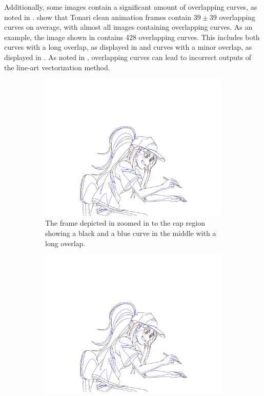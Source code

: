 Additionally, some images contain a significant amount of overlapping curves, as noted in .  show that Tonari clean animation frames contain $39\pm39$ overlapping curves on average, with almost all images containing overlapping curves. As an example, the image shown in  contains 428 overlapping curves. This includes both curves with a long overlap, as displayed in  and curves with a minor overlap, as displayed in . As noted in , overlapping curves can lead to incorrect outputs of the line-art vectorization method.

\begin{figure}
\centering
    \begin{subfigure}{.45\textwidth}
    \includegraphics[width=\textwidth,trim={34em 24em 27em 24em},clip]{graphics/douga/007AD_DOU_27.pdf}
        \caption{The frame depicted in  zoomed in to the cap region showing a black and a blue curve in the middle with a long overlap.}
        \label{fig:overlapping.long}
    \end{subfigure}
    \begin{subfigure}{.45\textwidth}
    \includegraphics[width=\textwidth,trim={38em 20em 25em 29em},clip]{graphics/douga/007AD_DOU_27.pdf}

\end{subfigure}
\end{figure}
